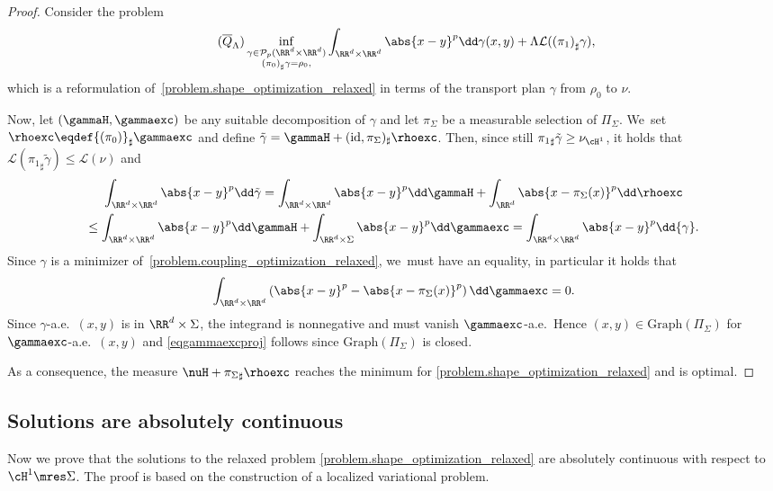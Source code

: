 \begin{proof}
Consider the problem\vspace*{-3pt}
\begin{align}
\label{problem.coupling_optimization_relaxed}
\tag{$\overline{Q}_\Lambda$}
\inf_{
\substack{
\gamma \in \mathcal{P}_p(\RR^d\times \RR^d)\\
{(\pi_{0})}_\sharp\gamma = \rho_0,
}
}
\int_{{\RR^d\times \RR^d}}\abs{x-y}^p\dd \gamma(x,y) + \Lambda \mathcal{L}({(\pi_{1})}_\sharp\gamma),
\end{align}
which is a reformulation of~\eqref{problem.shape_optimization_relaxed} in
terms of the transport plan $\gamma$ from $\rho_0$ to $\nu$.

Now, let $(\gammaH,\gammaexc)$ be any suitable decomposition of $\gamma$ and let $\pi_\Sigma$ be a measurable selection of $\Pi_\Sigma$. We~set $\rhoexc\eqdef {(\pi_{0})}_\sharp\gammaexc$ and define $\tilde{\gamma} = \gammaH + (\text{id},\pi_\Sigma)_{\sharp}\rhoexc$. Then,
since still ${\pi_1}_\sharp \tilde{\gamma}\ge \nu_{\cH^1}$,
it holds that $\mathcal{L}({\pi_{1}}_\sharp\tilde{\gamma})\leq \mathcal{L}(\nu)$ and
\begin{multline*}
\int_{{\RR^d\times \RR^d}}
\abs{x-y}^p\dd \tilde{\gamma}
= \int_{{\RR^d\times \RR^d}}
\abs{x-y}^p\dd \gammaH
+
\int_{\RR^d}
\abs{x-\pi_{\Sigma}(x)}^p\dd\rhoexc \\
\leq \int_{{\RR^d\times \RR^d}}\abs{x-y}^p\dd \gammaH+ \int_{\RR^d\times \Sigma}\abs{x-y}^p\dd\gammaexc = \int_{{\RR^d\times \RR^d}}\abs{x-y}^p\dd {\gamma}.
\end{multline*}
Since $\gamma$ is a minimizer of~\eqref{problem.coupling_optimization_relaxed}, we~must have an equality, in particular it holds that
\begin{equation*}
\int_{\RR^d\times \RR^d}\left( \abs{x-y}^p-\abs{x-\pi_{\Sigma}(x)}^p\right)\dd\gammaexc = 0.
\end{equation*}
Since $\gamma$-a.e.~$(x,y)$ is in $\RR^d\times \Sigma$, the integrand is nonnegative and must vanish $\gammaexc$-a.e.\ Hence $(x,y) \in \mathrm{Graph}(\Pi_\Sigma)$ for $\gammaexc$-a.e.\ $(x,y)$ and \eqref{eqgammaexcproj} follows since $\mathrm{Graph}(\Pi_\Sigma)$ is closed.

As a consequence, the measure $\nuH + {\pi_{\Sigma}}_\sharp\rhoexc$ reaches the minimum for \eqref{problem.shape_optimization_relaxed} and is optimal.
\end{proof}

\subsection{Solutions are absolutely continuous}
Now we prove
that the solutions to the relaxed problem \eqref{problem.shape_optimization_relaxed} are absolutely continuous with respect to $\cH^1\mres\Sigma$. The proof is based on the construction of a localized variational problem.


